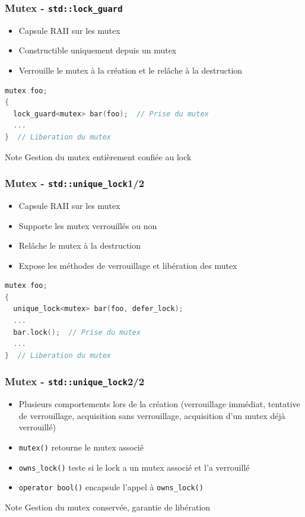 \documentclass[C++.tex]{subfiles}
\begin{document}
\begin{frame}[fragile]
	\frametitle{Mutex - \lstinline|std::lock_guard|}
	\begin{itemize}
		\item Capsule RAII sur les mutex
		\item Constructible uniquement depuis un mutex
		\item Verrouille le mutex à la création et le relâche à la destruction
	\end{itemize}

	\begin{lstlisting}[language=C++]
mutex foo;
{
  lock_guard<mutex> bar(foo);  // Prise du mutex
  ...
}  // Liberation du mutex\end{lstlisting}

	\begin{block}{Note}
		Gestion du mutex entièrement confiée au lock
	\end{block}
\end{frame}

\begin{frame}[fragile]
	\frametitle{Mutex - \lstinline|std::unique_lock|\titlehfill{}1/2}
	\begin{itemize}
		\item Capsule RAII sur les mutex
		\item Supporte les mutex verrouillés ou non
		\item Relâche le mutex à la destruction
		\item Expose les méthodes de verrouillage et libération des mutex
	\end{itemize}

	\begin{lstlisting}[language=C++]
mutex foo;
{
  unique_lock<mutex> bar(foo, defer_lock);
  ...
  bar.lock();  // Prise du mutex
  ...
}  // Liberation du mutex\end{lstlisting}
\end{frame}

\begin{frame}[fragile]
	\frametitle{Mutex - \lstinline|std::unique_lock|\titlehfill{}2/2}
	\begin{itemize}
		\item Plusieurs comportements lors de la création (verrouillage immédiat, tentative de verrouillage, acquisition sans verrouillage, acquisition d'un mutex déjà verrouillé)
		\item \lstinline|mutex()| retourne le mutex associé
		\item \lstinline|owns_lock()| teste si le lock a un mutex associé et l'a verrouillé
		\item \lstinline|operator bool()| encapsule l'appel à \lstinline|owns_lock()|
	\end{itemize}

	\begin{block}{Note}
		Gestion du mutex conservée, garantie de libération
	\end{block}
\end{frame}
\end{document}
